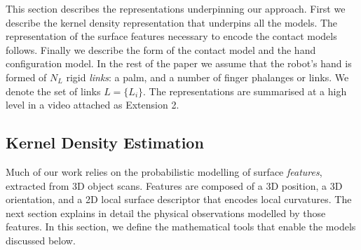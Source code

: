This section describes the representations underpinning our approach. First we describe the kernel density representation  that underpins all the models. The representation of the surface features necessary to encode the contact models follows. Finally we describe the form of the contact model and the hand configuration model. In the rest of the paper we assume that the robot's hand is formed of $N_L$ rigid \emph{links}: a palm, and a number of finger phalanges or links. We denote the set of links $L =\{L_i\}$. The representations are summarised at a high level in a video attached as Extension 2.




\subsection{Kernel Density Estimation}



\label{sec:kde}

Much of our work relies on the probabilistic modelling of surface \emph{features}, extracted from 3D object scans. Features are composed of a 3D position, a 3D orientation, and a 2D local surface descriptor that encodes local curvatures. The next section explains in detail the physical observations modelled by those features. In this section, we define the mathematical tools that enable the models discussed below.

